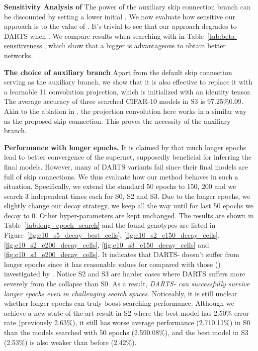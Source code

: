 \documentclass{article} \usepackage{iclr2021_conference,times}
\begin{document}
\textbf{Sensitivity Analysis of }\quad
The power of the auxiliary skip connection branch can be discounted by setting a lower initial . We now evaluate how sensitive our approach is to the value of . It's trivial to see that our approach degrades to DARTS when . We compare results when searching with  in Table~\ref{tab:beta-sensitiveness}, which show that a bigger  is advantageous to obtain better networks.

\textbf{The choice of auxiliary branch}
Apart from the default skip connection serving as the auxiliary branch, we show that it is also effective to replace it with a learnable 11 convolution projection, which is initialized with an identity tensor. The average accuracy of three searched CIFAR-10 models in S3 is 97.25\%0.09. Akin to the ablation in \cite{he2016deep}, the projection convolution here works in a similar way as the proposed skip connection. This proves the necessity of the auxiliary branch.

\textbf{Performance with longer epochs. } It is claimed by  \cite{bi2019stabilizing} that much longer epochs lead to better convergence of the supernet, supposedly beneficial for inferring the final models. However, many of DARTS variants fail since their final models are full of skip connections.  We thus evaluate how our method behaves in such a situation.  Specifically, we extend the standard 50 epochs to 150, 200 and we search 3 independent times each for S0, S2 and S3. Due to the longer epochs, we slightly change our decay strategy, we keep  all the way until for last 50 epochs we decay  to 0. Other hyper-parameters are kept unchanged. The results are shown in Table~\ref{tab:long_epoch_search} and the found genotypes are listed in Figure~\ref{fig:c10_s5_decay_best_cells}, \ref{fig:c10_s2_e150_decay_cells}, \ref{fig:c10_s2_e200_decay_cells}, \ref{fig:c10_s3_e150_decay_cells} and \ref{fig:c10_s3_e200_decay_cells}. It indicates that DARTS- doesn't suffer from longer epochs since it has reasonable values for  compared with those () investigated by \cite{bi2019stabilizing}. Notice S2 and S3 are harder cases where DARTS suffers more severely from the collapse than S0. As a result, \emph{DARTS- can successfully survive longer epochs even in challenging search spaces.} Noticeably, it is still unclear whether longer epochs can truly boost searching performance.  Although we achieve a new state-of-the-art result in S2 where the best model has 2.50\% error rate (previously 2.63\%), it still has worse average performance (2.710.11\%) in S0 than the models searched with 50 epochs (2.590.08\%), and the best model in S3 (2.53\%) is also weaker than before (2.42\%).
\end{document}
